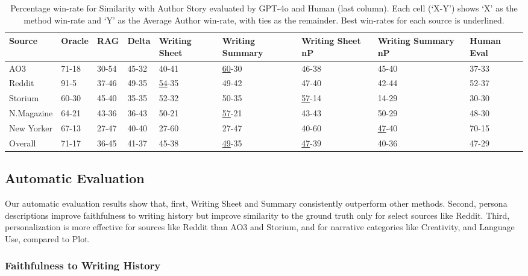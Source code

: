 \begin{table*}[htbp]
\centering
\caption{Percentage win-rate for Similarity with Author Story evaluated by GPT-4o and Human (last column). Each cell (`X-Y') shows `X' as the method win-rate and `Y' as the Average Author win-rate, with ties as the remainder. Best win-rates for each source is underlined.}
\label{tab:sim-auth-story}
\small
\begin{tabular}{p{2cm} p{1cm} p{1cm} p{1cm} p{1.25cm} p{1.5cm} p{1.25cm} p{1.75cm} p{1.25cm}}
\toprule
\textbf{Source} & \textbf{Oracle} & \textbf{RAG} & \textbf{Delta} & \textbf{Writing Sheet} & \textbf{Writing Summary} & \textbf{Writing Sheet nP} & \textbf{Writing Summary nP} & \textbf{Human Eval} \\
\midrule
AO3 & 71-18 & 30-54 & 45-32 & 40-41 & \underline{60}-30 & 46-38 & 45-40 & 37-33 \\
Reddit & 91-5 & 37-46 & 49-35 & \underline{54}-35 & 49-42 & 47-40 & 42-44 & 52-37 \\
Storium & 60-30 & 45-40 & 35-35 & 52-32 & 50-35 & \underline{57}-14 & 14-29 & 30-30 \\
N.Magazine & 64-21 & 43-36 & 36-43 & 50-21 & \underline{57}-21 & 43-43 & 50-29 & 48-30 \\
New Yorker & 67-13 & 27-47 & 40-40 & 27-60 & 27-47 & 40-60 & \underline{47}-40 & 70-15 \\
Overall & 71-17 & 36-45 & 41-37 & 45-38 & \underline{49}-35 & \underline{47}-39 & 40-36 & 47-29 \\
\bottomrule
\end{tabular}
\end{table*}




\subsection{Automatic Evaluation}
Our automatic evaluation results show that, first, Writing Sheet and Summary consistently outperform other methods. Second, persona descriptions improve faithfulness to writing history but improve similarity to the ground truth only for select sources like Reddit. Third, personalization is more effective for sources like Reddit than AO3 and Storium, and for narrative categories like Creativity, and Language Use, compared to Plot.


\subsubsection{Faithfulness to Writing History}


